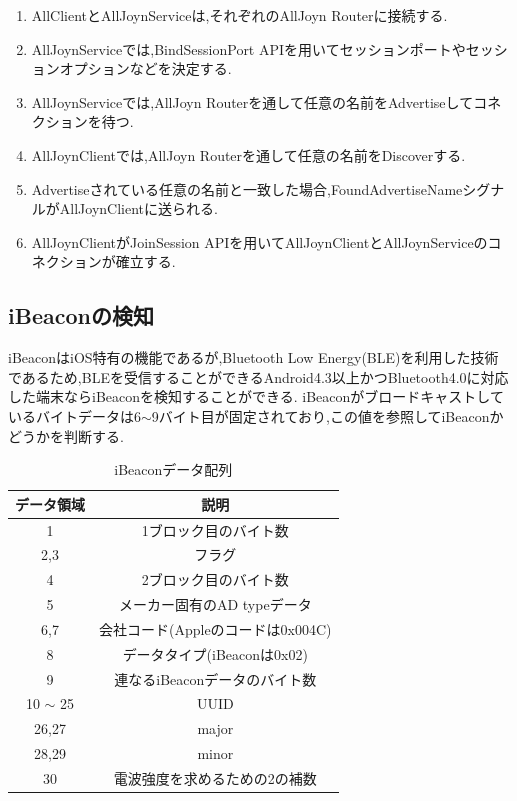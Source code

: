 \begin{enumerate}
\item AllClientとAllJoynServiceは,それぞれのAllJoyn Routerに接続する.
\item AllJoynServiceでは,BindSessionPort APIを用いてセッションポートやセッションオプションなどを決定する.
\item AllJoynServiceでは,AllJoyn Routerを通して任意の名前をAdvertiseしてコネクションを待つ.
\item AllJoynClientでは,AllJoyn Routerを通して任意の名前をDiscoverする.
\item Advertiseされている任意の名前と一致した場合,FoundAdvertiseNameシグナルがAllJoynClientに送られる.
\item AllJoynClientがJoinSession APIを用いてAllJoynClientとAllJoynServiceのコネクションが確立する.
\end{enumerate}


\subsection{iBeaconの検知}
iBeaconはiOS特有の機能であるが,Bluetooth Low Energy(BLE)を利用した技術であるため,BLEを受信することができるAndroid4.3以上かつBluetooth4.0に対応した端末ならiBeaconを検知することができる.
iBeaconがブロードキャストしているバイトデータは6$\sim$9バイト目が固定されており,この値を参照してiBeaconかどうかを判断する.

\begin{table}[htbp]
  \centering
  \begin{tabular}{|c|c|} \hline
    データ領域 & 説明 \\ \hline \hline
    1   & 1ブロック目のバイト数 \\ \hline
    2,3 & フラグ \\ \hline
    4   & 2ブロック目のバイト数 \\ \hline
    5   & メーカー固有のAD typeデータ \\ \hline
    6,7 & 会社コード(Appleのコードは0x004C) \\ \hline
    8   & データタイプ(iBeaconは0x02) \\ \hline
    9   & 連なるiBeaconデータのバイト数 \\ \hline
    10 $\sim$ 25 & UUID \\ \hline
    26,27 & major \\ \hline
    28,29 & minor \\ \hline
    30  & 電波強度を求めるための2の補数 \\ \hline
  \end{tabular}
  \caption{iBeaconデータ配列}
\end{table}

